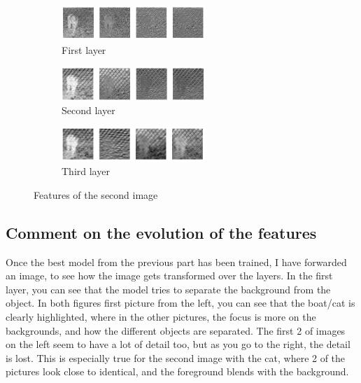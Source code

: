 \documentclass{article}
\begin{document}
    \begin{figure}[h!]
        \centering
        \begin{subfigure}[t]{0.6\textwidth}
            \centering
            \includegraphics[width=0.6\textwidth]{image2_layer1}
            \caption{First layer}
        \end{subfigure}
        \begin{subfigure}[t]{0.6\textwidth}
            \centering
            \includegraphics[width=0.6\textwidth]{image2_layer2}
            \caption{Second layer}
        \end{subfigure}
        \begin{subfigure}[t]{0.6\textwidth}
            \centering
            \includegraphics[width=0.6\textwidth]{image2_layer3}
            \caption{Third layer}
        \end{subfigure}
        \caption{Features of the second image}
    \end{figure}

    \subsection{Comment on the evolution of the features}
    Once the best model from the previous part has been trained, I have forwarded an image, to see how the image gets transformed over the layers. In the first layer, you can see that the model tries to separate the background from the object. In both figures first picture from the left, you can see that the boat/cat is clearly highlighted, where in the other pictures, the focus is more on the backgrounds, and how the different objects are separated. The first 2 of images on the left seem to have a lot of detail too, but as you go to the right, the detail is lost. This is especially true for the second image with the cat, where 2 of the pictures look close to identical, and the foreground blends with the background.\\
\end{document}
